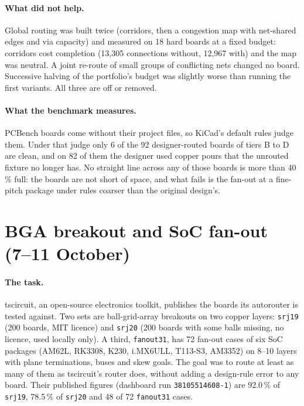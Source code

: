 \documentclass[10pt,a4paper]{article}
\begin{document}
\paragraph{What did not help.} Global routing was built twice (corridors, then a congestion map with net-shared
edges and via capacity) and measured on 18 hard boards at a fixed budget: corridors cost completion (13,305
connections without, 12,967 with) and the map was neutral. A joint re-route of small groups of conflicting nets
changed no board. Successive halving of the portfolio's budget was slightly worse than running the first variants.
All three are off or removed.

\paragraph{What the benchmark measures.} PCBench boards come without their project files, so KiCad's default rules
judge them. Under that judge only 6 of the 92 designer-routed boards of tiers B to D are clean, and on 82 of them
the designer used copper pours that the unrouted fixture no longer has. No straight line across any of those boards
is more than 40\,\% full: the boards are not short of space, and what fails is the fan-out at a fine-pitch package
under rules coarser than the original design's.

\section{BGA breakout and SoC fan-out (7--11 October)}
\label{sec:m14}

\paragraph{The task.} tscircuit, an open-source electronics toolkit, publishes the boards its autorouter is tested
against. Two sets are ball-grid-array breakouts on two copper layers: \texttt{srj19} (200 boards, MIT licence) and
\texttt{srj20} (200 boards with some balls missing, no licence, used locally only). A third, \texttt{fanout31}, has 72
fan-out cases of six SoC packages (AM62L, RK3308, K230, i.MX6ULL, T113-S3, AM3352) on 8--10 layers with plane
terminations, buses and skew goals. The goal was to route at least as many of them as tscircuit's router does,
without adding a design-rule error to any board. Their published figures (dashboard run \texttt{38105514608-1}) are
92.0\,\% of \texttt{srj19}, 78.5\,\% of \texttt{srj20} and 48 of 72 \texttt{fanout31} cases.
\end{document}
